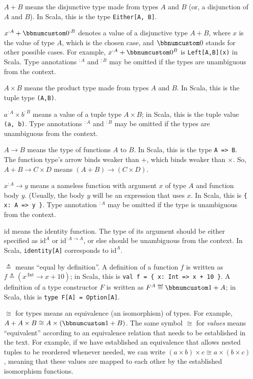 $A+B$ means the disjunctive type made from types $A$ and $B$ (or,
a disjunction of $A$ and $B$). In Scala, this is the type \texttt{}\lstinline!Either[A, B]!.

$x^{:A}+\bbnum 0^{:B}$ denotes a value of a disjunctive type $A+B$,
where $x$ is the value of type $A$, which is the chosen case, and
$\bbnum 0$ stands for other possible cases. For example, $x^{:A}+\bbnum 0^{B}$
is \lstinline!Left[A,B](x)! in Scala. Type annotations $^{:A}$ and
$^{:B}$ may be omitted if the types are unambiguous from the context.

$A\times B$ means the product type made from types $A$ and $B$.
In Scala, this is the tuple type \lstinline!(A,B)!.

$a^{:A}\times b^{:B}$ means a value of a tuple type $A\times B$;
in Scala, this is the tuple value \lstinline!(a, b)!. Type annotations
$^{:A}$ and $^{:B}$ may be omitted if the types are unambiguous
from the context.

$A\rightarrow B$ means the type of functions $A$ to $B$. In Scala,
this is the type \lstinline!A => B!. The function type\textsf{'}s arrow binds
weaker than $+$, which binds weaker than $\times$. So, $A+B\rightarrow C\times D$
means $(A+B)\rightarrow(C\times D)$.

$x^{:A}\rightarrow y$ means a nameless function with argument $x$
of type $A$ and function body $y$. (Usually, the body $y$ will
be an expression that uses $x$. In Scala, this is \lstinline!{ x: A => y }!.
Type annotation $^{:A}$ may be omitted if the type is unambiguous
from the context.

$\text{id}$ means the identity function. The type of its argument
should be either specified as $\text{id}^{A}$ or $\text{id}^{:A\rightarrow A}$,
or else should be unambiguous from the context. In Scala,  \lstinline!identity[A]!
corresponds to $\text{id}^{A}$.

$\triangleq$ means \textsf{``}equal by definition\textsf{''}. A definition of a function
$f$ is written as $f\triangleq(x^{:\text{Int}}\rightarrow x+10)$;
in Scala, this is \lstinline!val f = { x: Int => x + 10 }!. A definition
of a type constructor $F$ is written as $F^{A}\triangleq\bbnum 1+A$;
in Scala, this is \lstinline!type F[A] = Option[A]!.

$\cong$ for types means an equivalence (an isomorphism) of types.
For example, $A+A\times B\cong A\times\left(\bbnum 1+B\right)$. The
same symbol $\cong$ for \emph{values} means \textsf{``}equivalent\textsf{''} according
to an equivalence relation that needs to be established in the text.
For example, if we have established an equivalence that allows nested
tuples to be reordered whenever needed, we can write $\left(a\times b\right)\times c\cong a\times\left(b\times c\right)$,
meaning that these values are mapped to each other by the established
isomorphism functions. 

